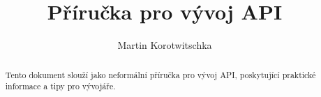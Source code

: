 \documentclass[12pt,a4paper]{article}
\title{Příručka pro vývoj API}
\author{Martin Korotwitschka}
\begin{document}
\maketitle %

\begin{abstract}
    Tento dokument slouží jako neformální příručka pro vývoj API, poskytující praktické informace a tipy pro vývojáře.
\end{abstract}

\tableofcontents %

\newpage



\end{document}
